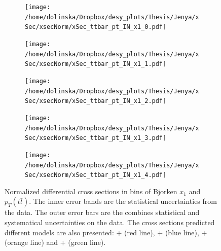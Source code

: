 \begin{figure}
\centering
\begin{subfigure}
  \centering
  \texttt{[image: /home/dolinska/Dropbox/desy\_plots/Thesis/Jenya/xSec/xsecNorm/xSec\_ttbar\_pt\_IN\_x1\_0.pdf]}
\end{subfigure}
\begin{subfigure}
  \centering
  \texttt{[image: /home/dolinska/Dropbox/desy\_plots/Thesis/Jenya/xSec/xsecNorm/xSec\_ttbar\_pt\_IN\_x1\_1.pdf]}
\end{subfigure}
\begin{subfigure}
  \centering
  \texttt{[image: /home/dolinska/Dropbox/desy\_plots/Thesis/Jenya/xSec/xsecNorm/xSec\_ttbar\_pt\_IN\_x1\_2.pdf]}
\end{subfigure}
\begin{subfigure}
  \centering
  \texttt{[image: /home/dolinska/Dropbox/desy\_plots/Thesis/Jenya/xSec/xsecNorm/xSec\_ttbar\_pt\_IN\_x1\_3.pdf]}
\end{subfigure}
\begin{subfigure}
  \centering
  \texttt{[image: /home/dolinska/Dropbox/desy\_plots/Thesis/Jenya/xSec/xsecNorm/xSec\_ttbar\_pt\_IN\_x1\_4.pdf]}
\end{subfigure}
\caption{Normalized differential cross sections in bins of Bjorken $x_{1}$ and $p_{T}(t\bar{t})$. The inner error bands are the statistical uncertainties from the data.
         The outer error bars are the combines statistical and systematical uncertainties on the data. The cross sections predicted different models are also presented:
         \MG + \PYTHIA (red line), \Powheg + \PYTHIA (blue line), \Powheg + \HERWIG (orange line) and \MCNLO + \HERWIG (green line).}
\label{fig:XS_2D_x1_pttt}
\end{figure}
